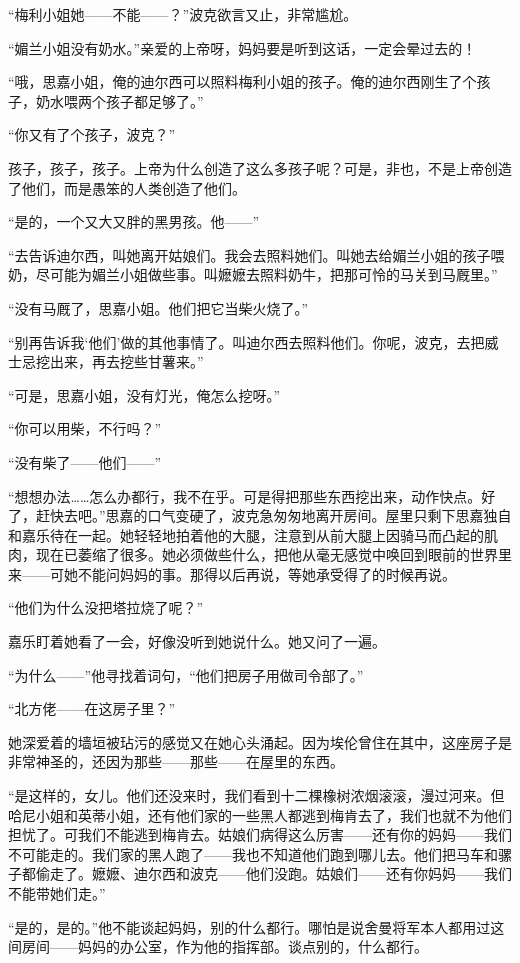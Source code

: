 \par “梅利小姐她——不能——？”波克欲言又止，非常尴尬。
\par “媚兰小姐没有奶水。”亲爱的上帝呀，妈妈要是听到这话，一定会晕过去的！
\par “哦，思嘉小姐，俺的迪尔西可以照料梅利小姐的孩子。俺的迪尔西刚生了个孩子，奶水喂两个孩子都足够了。”
\par “你又有了个孩子，波克？”
\par 孩子，孩子，孩子。上帝为什么创造了这么多孩子呢？可是，非也，不是上帝创造了他们，而是愚笨的人类创造了他们。
\par “是的，一个又大又胖的黑男孩。他——”
\par “去告诉迪尔西，叫她离开姑娘们。我会去照料她们。叫她去给媚兰小姐的孩子喂奶，尽可能为媚兰小姐做些事。叫嬷嬷去照料奶牛，把那可怜的马关到马厩里。”
\par “没有马厩了，思嘉小姐。他们把它当柴火烧了。”
\par “别再告诉我‘他们’做的其他事情了。叫迪尔西去照料他们。你呢，波克，去把威士忌挖出来，再去挖些甘薯来。”
\par “可是，思嘉小姐，没有灯光，俺怎么挖呀。”
\par “你可以用柴，不行吗？”
\par “没有柴了——他们——”
\par “想想办法……怎么办都行，我不在乎。可是得把那些东西挖出来，动作快点。好了，赶快去吧。”思嘉的口气变硬了，波克急匆匆地离开房间。屋里只剩下思嘉独自和嘉乐待在一起。她轻轻地拍着他的大腿，注意到从前大腿上因骑马而凸起的肌肉，现在已萎缩了很多。她必须做些什么，把他从毫无感觉中唤回到眼前的世界里来——可她不能问妈妈的事。那得以后再说，等她承受得了的时候再说。
\par “他们为什么没把塔拉烧了呢？”
\par 嘉乐盯着她看了一会，好像没听到她说什么。她又问了一遍。
\par “为什么——”他寻找着词句，“他们把房子用做司令部了。”
\par “北方佬——在这房子里？”
\par 她深爱着的墙垣被玷污的感觉又在她心头涌起。因为埃伦曾住在其中，这座房子是非常神圣的，还因为那些——那些——在屋里的东西。
\par “是这样的，女儿。他们还没来时，我们看到十二棵橡树浓烟滚滚，漫过河来。但哈尼小姐和英蒂小姐，还有他们家的一些黑人都逃到梅肯去了，我们也就不为他们担忧了。可我们不能逃到梅肯去。姑娘们病得这么厉害——还有你的妈妈——我们不可能走的。我们家的黑人跑了——我也不知道他们跑到哪儿去。他们把马车和骡子都偷走了。嬷嬷、迪尔西和波克——他们没跑。姑娘们——还有你妈妈——我们不能带她们走。”
\par “是的，是的。”他不能谈起妈妈，别的什么都行。哪怕是说舍曼将军本人都用过这间房间——妈妈的办公室，作为他的指挥部。谈点别的，什么都行。
